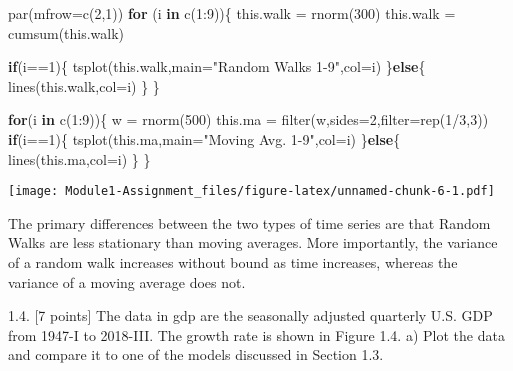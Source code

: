 \documentclass[
]{article}
\newenvironment{Shaded}{\begin{snugshade}}{\end{snugshade}}
\newcommand{\AttributeTok}[1]{\textcolor[rgb]{0.77,0.63,0.00}{#1}}
\newcommand{\ControlFlowTok}[1]{\textcolor[rgb]{0.13,0.29,0.53}{\textbf{#1}}}
\newcommand{\DecValTok}[1]{\textcolor[rgb]{0.00,0.00,0.81}{#1}}
\newcommand{\FunctionTok}[1]{\textcolor[rgb]{0.00,0.00,0.00}{#1}}
\newcommand{\NormalTok}[1]{#1}
\newcommand{\OtherTok}[1]{\textcolor[rgb]{0.56,0.35,0.01}{#1}}
\newcommand{\SpecialCharTok}[1]{\textcolor[rgb]{0.00,0.00,0.00}{#1}}
\newcommand{\StringTok}[1]{\textcolor[rgb]{0.31,0.60,0.02}{#1}}
\begin{document}
\begin{Shaded}
\begin{Highlighting}[]
\FunctionTok{par}\NormalTok{(}\AttributeTok{mfrow=}\FunctionTok{c}\NormalTok{(}\DecValTok{2}\NormalTok{,}\DecValTok{1}\NormalTok{))}
\ControlFlowTok{for}\NormalTok{ (i }\ControlFlowTok{in} \FunctionTok{c}\NormalTok{(}\DecValTok{1}\SpecialCharTok{:}\DecValTok{9}\NormalTok{))\{}
\NormalTok{  this.walk }\OtherTok{=} \FunctionTok{rnorm}\NormalTok{(}\DecValTok{300}\NormalTok{)}
\NormalTok{  this.walk }\OtherTok{=} \FunctionTok{cumsum}\NormalTok{(this.walk)}
  
  \ControlFlowTok{if}\NormalTok{(i}\SpecialCharTok{==}\DecValTok{1}\NormalTok{)\{}
    \FunctionTok{tsplot}\NormalTok{(this.walk,}\AttributeTok{main=}\StringTok{"Random Walks 1{-}9"}\NormalTok{,}\AttributeTok{col=}\NormalTok{i)}
\NormalTok{  \}}\ControlFlowTok{else}\NormalTok{\{}
    \FunctionTok{lines}\NormalTok{(this.walk,}\AttributeTok{col=}\NormalTok{i)}
\NormalTok{  \}}
\NormalTok{\}}

\ControlFlowTok{for}\NormalTok{(i }\ControlFlowTok{in} \FunctionTok{c}\NormalTok{(}\DecValTok{1}\SpecialCharTok{:}\DecValTok{9}\NormalTok{))\{}
\NormalTok{  w }\OtherTok{=} \FunctionTok{rnorm}\NormalTok{(}\DecValTok{500}\NormalTok{)}
\NormalTok{  this.ma }\OtherTok{=} \FunctionTok{filter}\NormalTok{(w,}\AttributeTok{sides=}\DecValTok{2}\NormalTok{,}\AttributeTok{filter=}\FunctionTok{rep}\NormalTok{(}\DecValTok{1}\SpecialCharTok{/}\DecValTok{3}\NormalTok{,}\DecValTok{3}\NormalTok{))}
  \ControlFlowTok{if}\NormalTok{(i}\SpecialCharTok{==}\DecValTok{1}\NormalTok{)\{}
    \FunctionTok{tsplot}\NormalTok{(this.ma,}\AttributeTok{main=}\StringTok{"Moving Avg. 1{-}9"}\NormalTok{,}\AttributeTok{col=}\NormalTok{i)}
\NormalTok{  \}}\ControlFlowTok{else}\NormalTok{\{}
    \FunctionTok{lines}\NormalTok{(this.ma,}\AttributeTok{col=}\NormalTok{i)}
\NormalTok{  \}}
\NormalTok{\}}
\end{Highlighting}
\end{Shaded}

\texttt{[image: Module1-Assignment\_files/figure-latex/unnamed-chunk-6-1.pdf]}

The primary differences between the two types of time series are that
Random Walks are less stationary than moving averages. More importantly,
the variance of a random walk increases without bound as time increases,
whereas the variance of a moving average does not.

1.4. {[}7 points{]} The data in gdp are the seasonally adjusted
quarterly U.S. GDP from 1947-I to 2018-III. The growth rate is shown in
Figure 1.4. a) Plot the data and compare it to one of the models
discussed in Section 1.3.
\end{document}
